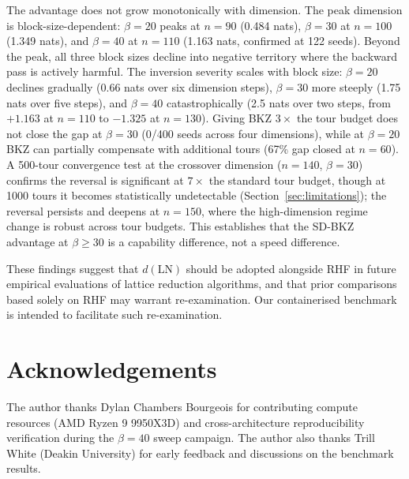 \documentclass[journal=cic,version=preprint]{iacrj}
\begin{document}
The advantage does not grow monotonically with dimension. The peak dimension is block-size-dependent: $\beta=20$ peaks at $n=90$ (0.484 nats), $\beta=30$ at $n=100$ (1.349 nats), and $\beta=40$ at $n=110$ (1.163 nats, confirmed at 122 seeds). Beyond the peak, all three block sizes decline into negative territory where the backward pass is actively harmful. The inversion severity scales with block size: $\beta=20$ declines gradually (0.66 nats over six dimension steps), $\beta=30$ more steeply (1.75 nats over five steps), and $\beta=40$ catastrophically (2.5 nats over two steps, from $+1.163$ at $n=110$ to $-1.325$ at $n=130$). Giving BKZ $3\times$ the tour budget does not close the gap at $\beta=30$ (0/400 seeds across four dimensions), while at $\beta=20$ BKZ can partially compensate with additional tours (67\% gap closed at $n=60$). A 500-tour convergence test at the crossover dimension ($n=140$, $\beta=30$) confirms the reversal is significant at $7\times$ the standard tour budget, though at 1000 tours it becomes statistically undetectable (Section~\ref{sec:limitations}); the reversal persists and deepens at $n=150$, where the high-dimension regime change is robust across tour budgets. This establishes that the SD-BKZ advantage at $\beta\geq 30$ is a capability difference, not a speed difference.

These findings suggest that $d(\mathrm{LN})$ should be adopted alongside RHF in future empirical evaluations of lattice reduction algorithms, and that prior comparisons based solely on RHF may warrant re-examination. Our containerised benchmark is intended to facilitate such re-examination.

\section*{Acknowledgements}

The author thanks Dylan Chambers Bourgeois for contributing compute resources (AMD Ryzen 9 9950X3D) and cross-architecture reproducibility verification during the $\beta=40$ sweep campaign. The author also thanks Trill White (Deakin University) for early feedback and discussions on the benchmark results.


\end{document}
